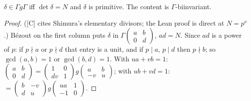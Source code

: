 \begin{proposition}\label{prop:cosets}
  \leanok
  $\delta\in\Gamma g\Gamma$ iff $\det\delta=N$ and $\delta$ is primitive. The content is $\Gamma$-biinvariant.
\end{proposition}
\begin{proof}
  \leanok
  ([C] cites Shimura's elementary divisors; the Lean proof is direct at $N=p^\nu$.) Bézout on the first column puts $\delta$
  in $\Gamma\left(\begin{smallmatrix}a&b\\0&d\end{smallmatrix}\right)$, $ad=N$. Since $ad$ is a power of $p$: if $p\nmid a$ or
  $p\nmid d$ that entry is a unit, and if $p\mid a$, $p\mid d$ then $p\nmid b$; so $\gcd(a,b)=1$ or $\gcd(b,d)=1$. With
  $ua+vb=1$: $\left(\begin{smallmatrix}a&b\\0&d\end{smallmatrix}\right)=\left(\begin{smallmatrix}1&0\\dv&1\end{smallmatrix}\right)
  g\left(\begin{smallmatrix}a&b\\-v&u\end{smallmatrix}\right)$; with $ub+vd=1$:
  $=\left(\begin{smallmatrix}b&-v\\d&u\end{smallmatrix}\right)g\left(\begin{smallmatrix}ua&1\\-1&0\end{smallmatrix}\right)$.
\end{proof}

